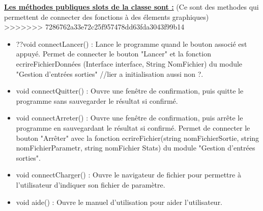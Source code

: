 \documentclass[a4paper,11pt]{article}
\begin{document}
			\underline{\bf Les méthodes publiques slots de la classe sont :} (Ce sont des methodes qui permettent de connecter des fonctions à des élements graphiques)\\

>>>>>>> 7286762a33e72c25f957478dd63fda3043f99b14
			\begin{itemize}
				\item ??void connectLancer() : Lance le programme quand le bouton associé est appuyé. Permet de connecter le bouton "Lancer" et la fonction ecrireFichierDonnées (Interface interface, String NomFichier) du module "Gestion d'entrées sorties" //lier a initialisation aussi non ?.\vspace{0.2cm}
				\item void connectQuitter() : Ouvre une fenêtre de confirmation, puis quitte le programme sans sauvegarder le résultat si confirmé.\vspace{0.2cm}
				\item void connectArreter() : Ouvre une fenêtre de confirmation, puis arrête le programme en sauvegardant le résultat si confirmé. Permet de connecter le bouton "Arrêter" avec la fonction ecrireFichier(string nomFichierSortie, string nomFichierParametr, string nomFichier Stats) du module "Gestion d'entrées sorties".\vspace{0.2cm} 
				\item void connectCharger() : Ouvre le navigateur de fichier pour permettre à l’utilisateur d’indiquer son fichier de paramètre.\vspace{0.2cm}
				\item void aide() : Ouvre le manuel d’utilisation pour aider l’utilisateur.\\
			\end{itemize}
			
\end{document}
